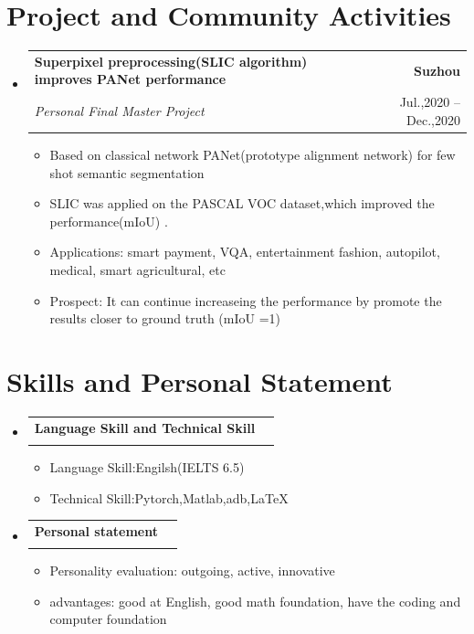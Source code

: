 \documentclass[A4,11pt]{article}
\makeatletter
\newcommand{\CVItem}[1]{
  \item\small{
    {#1 \vspace{-2pt}}
  }
}
\newcommand{\CVSubheading}[4]{
  \vspace{-2pt}\item
    \begin{tabular*}{0.97\textwidth}[t]{l@{\extracolsep{\fill}}r}
      \textbf{#1} & #2 \\
      \small#3 & \small #4 \\
    \end{tabular*}\vspace{-7pt}
}
\newcommand{\CVSubHeadingListStart}{\begin{itemize}[leftmargin=0.5cm, label={}]}
\newcommand{\CVSubHeadingListEnd}{\end{itemize}}
\newcommand{\CVItemListStart}{\begin{itemize}}
\newcommand{\CVItemListEnd}{\end{itemize}\vspace{-5pt}}
\makeatother
\begin{document}
\section{Project and Community Activities}
  \CVSubHeadingListStart
     \CVSubheading
      {Superpixel preprocessing(SLIC algorithm) improves PANet performance}{\textbf{Suzhou}}
      {\textit{Personal Final Master Project}}{Jul.,2020 -- Dec.,2020}
      \CVItemListStart
        \CVItem{Based on classical network PANet(prototype alignment network) for few shot semantic segmentation}
        \CVItem{SLIC was applied on the PASCAL VOC dataset,which improved the performance(mIoU)}.
        \CVItem{Applications: smart payment, VQA, entertainment fashion, autopilot, medical, smart agricultural, etc}
        \CVItem{Prospect: It can continue increaseing the performance by promote the results closer to ground truth (mIoU =1)}
    \CVItemListEnd
  \CVSubHeadingListEnd

\section{Skills and Personal Statement}
  \CVSubHeadingListStart
    \CVSubheading
      {Language Skill and Technical Skill}{}
      {}{}
      \vspace{-16pt}
      \CVItemListStart
        \CVItem{Language Skill:Engilsh(IELTS 6.5)}
        \CVItem{Technical Skill:Pytorch,Matlab,adb,LaTeX}
    \CVItemListEnd
  \CVSubHeadingListEnd
   \CVSubHeadingListStart
    \CVSubheading
      {Personal statement}{}
      {}{}
      \vspace{-16pt}
      \CVItemListStart
        \CVItem{Personality evaluation: outgoing, active, innovative}
        \CVItem{advantages: good at English, good math foundation, have the coding and computer foundation}
    \CVItemListEnd
  \CVSubHeadingListEnd
\end{document}
